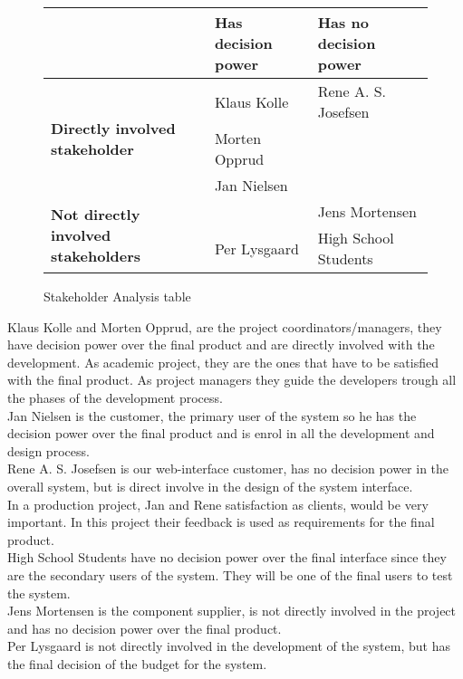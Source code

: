 \begin{figure}[h!]
 \begin{center}
  \begin{tabular}{| l | l | l |}
   \hline
    & \textbf{Has decision power} & \textbf{Has no decision power} \\ \hline
    \multirow{3}{*}{\textbf{Directly involved stakeholder}} 
    	& Klaus Kolle & Rene A. S. Josefsen\\ 
    	& Morten Opprud &  \\ 
    	& Jan Nielsen &  \\ \hline
    \multirow{2}{*}{\textbf{Not directly involved stakeholders}} 
    	&  & Jens Mortensen\\
    	& Per Lysgaard & High School Students \\ \hline
   \end{tabular}
  \end{center}
 \caption{Stakeholder Analysis table}
\end{figure}

Klaus Kolle and Morten Opprud, are the project coordinators/managers, they
have decision power over the final product and are directly involved with the development. As academic project, they are the ones that have to be satisfied with the final product. As project managers they guide the developers trough all the phases of the development process.\\

Jan Nielsen is the customer, the primary user of the system so he has the decision power over the final product and is enrol in all the development and design process. \\

Rene A. S. Josefsen is our web-interface customer, has no decision power in the overall system, but is direct involve in the design of the system interface.\\

In a production project, Jan and Rene satisfaction as clients, would be very important. In this project their feedback is used as requirements for the final product.\\ 

High School Students have no decision power over the final interface since they are the secondary users of the system. They will be one of the final users to test the system.\\

Jens Mortensen is the component supplier, is not directly involved in the project and has no decision power over the final product.\\

Per Lysgaard is not directly involved in the development of the system, but has the final decision of the budget for the system.\\

